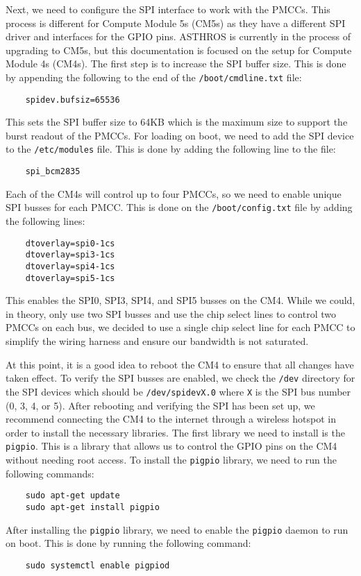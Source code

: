 Next, we need to configure the SPI interface to work with the PMCCs.
This process is different for Compute Module 5s (CM5s) as they have a different SPI driver and interfaces for the GPIO pins.
ASTHROS is currently in the process of upgrading to CM5s, but this documentation is focused on the setup for Compute Module 4s (CM4s).
The first step is to increase the SPI buffer size.
This is done by appending the following to the end of the \texttt{/boot/cmdline.txt} file:
\begin{verbatim}
    spidev.bufsiz=65536
\end{verbatim}
This sets the SPI buffer size to 64KB which is the maximum size to support the burst readout of the PMCCs.
For loading on boot, we need to add the SPI device to the \texttt{/etc/modules} file.
This is done by adding the following line to the file:
\begin{verbatim}
    spi_bcm2835
\end{verbatim}
Each of the CM4s will control up to four PMCCs, so we need to enable unique SPI busses for each PMCC.
This is done on the \texttt{/boot/config.txt} file by adding the following lines:
\begin{verbatim}
    dtoverlay=spi0-1cs
    dtoverlay=spi3-1cs
    dtoverlay=spi4-1cs
    dtoverlay=spi5-1cs
\end{verbatim}
This enables the SPI0, SPI3, SPI4, and SPI5 busses on the CM4.
While we could, in theory, only use two SPI busses and use the chip select lines to control two PMCCs on each bus, we decided to use a single chip select line for each PMCC to simplify the wiring harness and ensure our bandwidth is not saturated.

At this point, it is a good idea to reboot the CM4 to ensure that all changes have taken effect.
To verify the SPI busses are enabled, we check the \texttt{/dev} directory for the SPI devices which should be \texttt{/dev/spidevX.0} where \texttt{X} is the SPI bus number (0, 3, 4, or 5).
After rebooting and verifying the SPI has been set up, we recommend connecting the CM4 to the internet through a wireless hotspot in order to install the necessary libraries.
The first library we need to install is the \texttt{pigpio}.
This is a library that allows us to control the GPIO pins on the CM4 without needing root access.
To install the \texttt{pigpio} library, we need to run the following commands:
\begin{verbatim}
    sudo apt-get update
    sudo apt-get install pigpio
\end{verbatim}
After installing the \texttt{pigpio} library, we need to enable the \texttt{pigpio} daemon to run on boot.
This is done by running the following command:
\begin{verbatim}
    sudo systemctl enable pigpiod
\end{verbatim}

